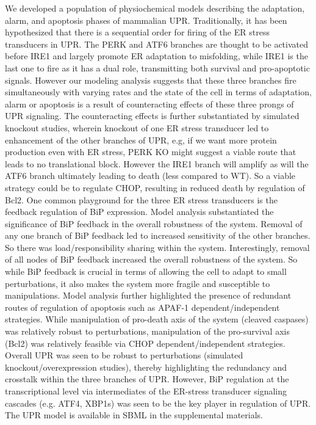 \documentclass[fleqn,10pt]{wlscirep}
\begin{document}
We developed a population of physiochemical models describing the adaptation, alarm, and apoptosis phases of mammalian UPR.
Traditionally, it has been hypothesized that there is a sequential order for firing of the ER stress transducers in UPR.
The PERK and ATF6 branches are thought to be activated before IRE1 \cite{szegezdi2006mediators} and largely promote ER adaptation to misfolding, while IRE1 is the last one to fire as it has a dual role, transmitting both survival and pro-apoptotic signals.
However our modeling analysis suggests that these three branches fire simultaneously with varying rates and the state of the cell in terms of adaptation, alarm or apoptosis is a result of counteracting effects of these three prongs of UPR signaling.
The counteracting effects is further substantiated by simulated knockout studies, wherein knockout of one ER stress transducer led to enhancement of the other branches of UPR, e.g, if we want more protein production even with ER stress, PERK KO might suggest a viable route that leads to no translational block.
However the IRE1 branch will amplify as will the ATF6 branch ultimately leading to death (less compared to WT). So a viable strategy could be to regulate CHOP, resulting in reduced death by regulation of Bcl2.
One common playground for the three ER stress transducers is the feedback regulation of BiP expression. Model analysis substantiated the significance of BiP feedback in the overall robustness of the system.
Removal of any one branch of BiP feedback led to increased sensitivity of the other branches. So there was load/responsibility sharing within the system.
Interestingly, removal of all nodes of BiP feedback increased the overall robustness of the system. So while BiP feedback is crucial in terms of allowing the cell to adapt to small perturbations, it also makes the system more fragile and susceptible to manipulations.
Model analysis further highlighted the presence of redundant routes of regulation of apoptosis such as APAF-1 dependent/independent strategies.
While manipulation of pro-death axis of the system (cleaved caspases) was relatively robust to perturbations, manipulation of the pro-survival axis (Bcl2) was relatively feasible via CHOP dependent/independent strategies.
Overall UPR was seen to be robust to perturbations (simulated knockout/overexpression studies), thereby highlighting the redundancy and crosstalk within the three branches of UPR.
However, BiP regulation at the transcriptional level via intermediates of the ER-stress transducer signaling cascades (e.g. ATF4, XBP1s) was seen to be the key player in regulation of UPR.
The UPR model is available in SBML in the supplemental materials.
\end{document}
